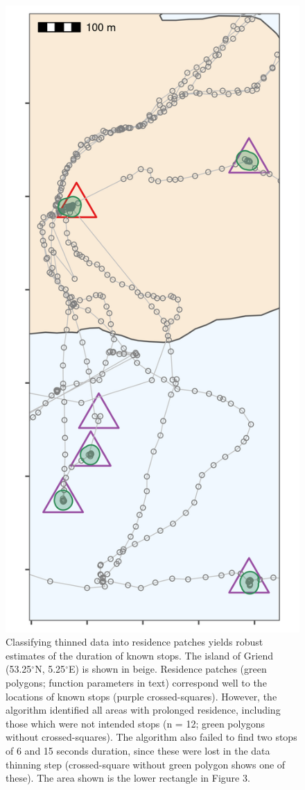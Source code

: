 \documentclass[]{scrreprt}
\begin{document}
\begin{figure}
\centering
\includegraphics{figures/fig_calib_residence.png}
\caption{Classifying thinned data into residence patches yields robust estimates of the duration of known stops. The island of Griend (53.25\(^{\circ}\)N, 5.25\(^{\circ}\)E) is shown in beige. Residence patches (green polygons; function parameters in text) correspond well to the locations of known stops (purple crossed-squares). However, the algorithm identified all areas with prolonged residence, including those which were not intended stops (n = 12; green polygons without crossed-squares). The algorithm also failed to find two stops of 6 and 15 seconds duration, since these were lost in the data thinning step (crossed-square without green polygon shows one of these). The area shown is the lower rectangle in Figure 3.}
\end{figure}
\end{document}
